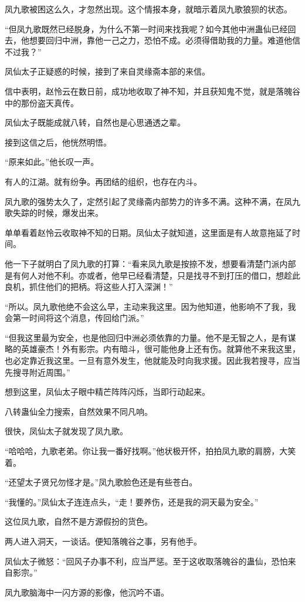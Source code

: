 \begin{this_body}
凤九歌被困这么久，才忽然出现。这个情报本身，就暗示着凤九歌狼狈的状态。

“但凤九歌既然已经脱身，为什么不第一时间来找我呢？如今其他中洲蛊仙已经回去，他想要回归中洲，靠他一己之力，恐怕不成。必须得借助我的力量。难道他信不过我？”

凤仙太子正疑惑的时候，接到了来自灵缘斋本部的来信。

信中表明，赵怜云在数日前，成功地收取了神不知，并且获知鬼不觉，就是落魄谷中的那份盗天真传。

凤仙太子既能成就八转，自然也是心思通透之辈。

接到这信之后，他恍然明悟。

“原来如此。”他长叹一声。

有人的江湖。就有纷争。再团结的组织，也存在内斗。

凤九歌的强势太久了，定然引起了灵缘斋内部势力的许多不满。这种不满，在凤九歌失踪的时候，爆发出来。

单单看着赵怜云收取神不知的日期。凤仙太子就知道，这里面是有人故意拖延了时间。

他一下子就明白了凤九歌的打算：“看来凤九歌是按捺不发，想要看清楚门派内部是有何人对他不利。亦或者，他早已经看清楚，只是找寻不到打压的借口，想趁此良机，抓住他们的把柄。将这些人打入深渊！”

“所以。凤九歌他绝不会这么早，主动来我这里。因为他知道，他影响不了我，我会第一时间将这个消息，传回给门派。”

“但我这里最为安全，也是他回归中洲必须依靠的力量。他不是无智之人，是有谋略的英雄豪杰！外有影宗。内有暗斗，很可能他身上还有伤。就算他不来我这里，也必定靠近我这里。一旦有意外发生，他就能及时向我求援。因此我若搜寻，应当先搜寻附近周围。”

想到这里，凤仙太子眼中精芒阵阵闪烁，当即行动起来。

八转蛊仙全力搜索，自然效果不同凡响。

很快，凤仙太子就发现了凤九歌。

“哈哈哈，九歌老弟。你让我一番好找啊。”他状极开怀，拍拍凤九歌的肩膀，大笑着。

“还望太子贤兄勿怪才是。”凤九歌脸色还是有些苍白。

“我懂的。”凤仙太子连连点头，“走！要养伤，还是我的洞天最为安全。”

这位凤九歌，自然不是方源假扮的货色。

两人进入洞天，一谈话。便知落魄谷之事，另有他手。

凤仙太子微怒：“回风子办事不利，应当严惩。至于这收取落魄谷的蛊仙，恐怕来自影宗。”

凤九歌脑海中一闪方源的影像，他沉吟不语。


\end{this_body}
